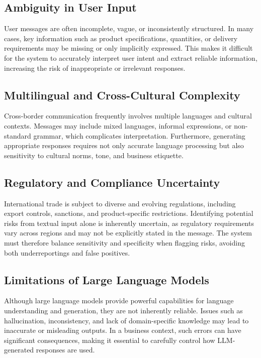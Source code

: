 \documentclass[12pt,a4paper]{report}
\begin{document}
\subsection{Ambiguity in User Input}

User messages are often incomplete, vague, or inconsistently structured. In many cases, key information such as product specifications, quantities, or delivery requirements may be missing or only implicitly expressed. This makes it difficult for the system to accurately interpret user intent and extract reliable information, increasing the risk of inappropriate or irrelevant responses.

\subsection{Multilingual and Cross-Cultural Complexity}

Cross-border communication frequently involves multiple languages and cultural contexts. Messages may include mixed languages, informal expressions, or non-standard grammar, which complicates interpretation. Furthermore, generating appropriate responses requires not only accurate language processing but also sensitivity to cultural norms, tone, and business etiquette.

\subsection{Regulatory and Compliance Uncertainty}

International trade is subject to diverse and evolving regulations, including export controls, sanctions, and product-specific restrictions. Identifying potential risks from textual input alone is inherently uncertain, as regulatory requirements vary across regions and may not be explicitly stated in the message. The system must therefore balance sensitivity and specificity when flagging risks, avoiding both underreportings and false positives.

\subsection{Limitations of Large Language Models}

Although large language models provide powerful capabilities for language understanding and generation, they are not inherently reliable. Issues such as hallucination, inconsistency, and lack of domain-specific knowledge may lead to inaccurate or misleading outputs. In a business context, such errors can have significant consequences, making it essential to carefully control how LLM-generated responses are used.
\end{document}
